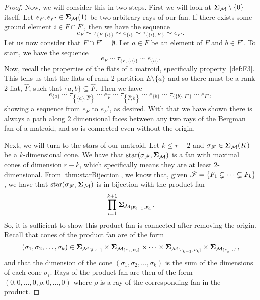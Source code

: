 \documentclass[12pt,oneside]{../../sfsuthesis}
\begin{document}
\begin{proof}
    Now, we will consider this in two steps.
    First we will look at \( {\bm{\Sigma}}_{\mathcal{M}} \setminus \{ 0 \} \) itself.
    Let \( e_{F}, e_{F'} \in {\bm{\Sigma}}_{\mathcal{M}}(1) \) be two arbitrary rays of our fan.
    If there exists some ground element \( i \in F \cap F' \), then we have the sequence
    \[
        e_F \sim \tau_{\{F, \{i\}\}} \sim e_{\{i\}} \sim \tau_{\{\{i\}, F'\}} \sim e_{F'}.
    \]
    Let us now consider that \( F \cap F' = \emptyset \).
    Let \( a \in F \) be an element of \( F \) and \( b \in F' \).
    To start, we have the sequence
    \[
        e_F \sim \tau_{\{F, \{a\}\}} \sim e_{\{a\}}.
    \]
    Now, recall the properties of the flats of a matroid, specifically property~\ref{def:F3}.
    This tells us that the flats of rank 2 partition \( E \setminus \{a\} \) and so there must be a rank 2 flat, \( \widehat{F} \), such that \( \{ a, b \} \subseteq \widehat{F} \).
    Then we have
    \[
        e_{\{a\}} \sim \tau_{\left\{\{a\}, \widehat{F}\right\}} \sim e_{\widehat{F}} \sim \tau_{\left\{\widehat{F}, b\right\}} \sim e_{\{b\}} \sim \tau_{\{\{b\}, F'\}} \sim e_{F'},
    \]
    showing a sequence from \( e_F \) to \( e_F' \), as desired.
    With that we have shown there is always a path along 2 dimensional faces between any two rays of the Bergman fan of a matroid, and so is connected even without the origin.

    Next, we will turn to the stars of our matroid.
    Let \( k \leq r - 2 \) and \( \sigma_{\mathscr{F}} \in {\bm{\Sigma}}_{\mathcal{M}}(K) \) be a \( k \)-dimensional cone.
    We have that \( \operatorname{star}( \sigma_{\mathscr{F}}, {\bm{\Sigma}}_{\mathcal{M}}) \) is a fan with maximal cones of dimension \( r - k \), which specifically means they are at least \( 2 \)-dimensional.
    From \th\ref{thm:starBijection}, we know that, given \( \mathscr{F} = \{ F_1 \subsetneq \cdots \subsetneq F_k \} \), we have that \( \operatorname{star}( \sigma_{\mathscr{F}}, {\bm{\Sigma}}_{\mathcal{M}}) \) is in bijection with the product fan
    \[
        \prod_{i = 1}^{k+1} {\bm{\Sigma}}_{\mathcal{M}_{[F_{i-1}, F_i]}}.
    \]
    So, it is sufficient to show this product fan is connected after removing the origin.
    Recall that cones of the product fan are of the form
    \[
        (\sigma_1, \sigma_2, \dots, \sigma_k) \in {\bm{\Sigma}}_{\mathcal{M}_{[\emptyset, F_1]}} \times {\bm{\Sigma}}_{\mathcal{M}_{[F_{1}, F_2]}} \times \cdots \times {\bm{\Sigma}}_{\mathcal{M}_{[F_{k-1}, F_k]}} \times {\bm{\Sigma}}_{\mathcal{M}_{[F_{k}, E]}},
    \]
    and that the dimension of the cone \( (\sigma_1, \sigma_2, \dots, \sigma_k) \) is the sum of the dimensions of each cone \( \sigma_i \).
    Rays of the product fan are then of the form \( (0, 0, \dots, 0,  \rho, 0, \dots, 0) \) where \( \rho \) is a ray of the corresponding fan in the product.


\end{proof}
\end{document}
